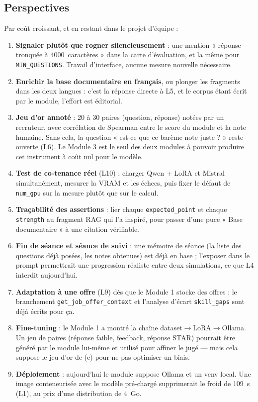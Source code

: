 \subsection{Perspectives}

Par coût croissant, et en restant dans le projet d'équipe :

\begin{enumerate}[label=\textbf{(\alph*)},leftmargin=*,itemsep=3pt]
  \item \textbf{Signaler plutôt que rogner silencieusement} : une mention
        « réponse tronquée à 4000~caractères » dans la carte d'évaluation, et la
        même pour \texttt{MIN\_QUESTIONS}. Travail d'interface, aucune mesure
        nouvelle nécessaire.
  \item \textbf{Enrichir la base documentaire en français}, ou plonger les
        fragments dans les deux langues : c'est la réponse directe à L5, et le
        corpus étant écrit par le module, l'effort est éditorial.
  \item \textbf{Jeu d'or annoté} : 20 à 30 paires (question, réponse) notées par
        un recruteur, avec corrélation de Spearman entre le score du module et la
        note humaine. Sans cela, la question « est-ce que ce barème note juste ? »
        reste ouverte (L6). Le Module 3 est le seul des deux modules à pouvoir
        produire cet instrument à coût nul pour le modèle.
  \item \textbf{Test de co-tenance réel} (L10) : charger Qwen + LoRA et Mistral
        simultanément, mesurer la VRAM et les échecs, puis fixer le défaut de
        \texttt{num\_gpu} sur la mesure plutôt que sur le calcul.
  \item \textbf{Traçabilité des assertions} : lier chaque \texttt{expected\_point}
        et chaque \texttt{strength} au fragment RAG qui l'a inspiré, pour passer
        d'une puce « Base documentaire » à une citation vérifiable.
  \item \textbf{Fin de séance et séance de suivi} : une mémoire de séance (la
        liste des questions déjà posées, les notes obtenues) est déjà en base ;
        l'exposer dans le prompt permettrait une progression réaliste entre deux
        simulations, ce que L4 interdit aujourd'hui.
  \item \textbf{Adaptation à une offre} (L9) dès que le Module 1 stocke des
        offres : le branchement \texttt{get\_job\_offer\_context} et l'analyse
        d'écart \texttt{skill\_gaps} sont déjà écrits pour ça.
  \item \textbf{Fine-tuning} : le Module 1 a montré la chaîne
        dataset$\to$LoRA$\to$Ollama. Un jeu de paires (réponse faible, feedback,
        réponse STAR) pourrait être généré par le module lui-même et utilisé pour
        affiner le jugé --- mais cela suppose le jeu d'or de (c) pour ne pas
        optimiser un biais.
  \item \textbf{Déploiement} : aujourd'hui le module suppose Ollama et un venv
        local. Une image conteneurisée avec le modèle pré-chargé supprimerait le
        froid de 109~s (L1), au prix d'une distribution de 4~Go.
\end{enumerate}
